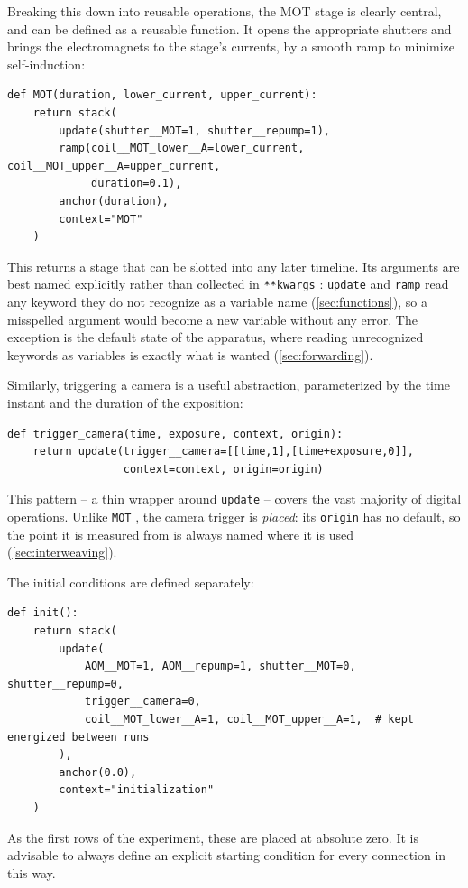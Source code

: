 \documentclass{SciPost}
\newcommand{\python}[1]{%
  \texttt{#1}%
}
\begin{document}
Breaking this down into reusable operations, the MOT stage is clearly central, and can be defined as a reusable function. It opens the appropriate shutters and brings the electromagnets to the stage’s currents, by a smooth ramp to minimize self-induction:
\begin{verbatim}
def MOT(duration, lower_current, upper_current):
    return stack(
        update(shutter__MOT=1, shutter__repump=1),
        ramp(coil__MOT_lower__A=lower_current, coil__MOT_upper__A=upper_current,
             duration=0.1),
        anchor(duration),
        context="MOT"
    )
\end{verbatim}
This returns a stage that can be slotted into any later timeline. Its arguments are best named explicitly rather than collected in \python{**kwargs}: \python{update} and \python{ramp} read any keyword they do not recognize as a variable name (\cref{sec:functions}), so a misspelled argument would become a new variable without any error. The exception is the default state of the apparatus, where reading unrecognized keywords as variables is exactly what is wanted (\cref{sec:forwarding}).

Similarly, triggering a camera is a useful abstraction, parameterized by the time instant and the duration of the exposition:
\begin{verbatim}
def trigger_camera(time, exposure, context, origin):
    return update(trigger__camera=[[time,1],[time+exposure,0]],
                  context=context, origin=origin)
\end{verbatim}
This pattern – a thin wrapper around \python{update} – covers the vast majority of digital operations. Unlike \python{MOT}, the camera trigger is \emph{placed}: its \python{origin} has no default, so the point it is measured from is always named where it is used (\cref{sec:interweaving}).

The initial conditions are defined separately:
\begin{verbatim}
def init():
    return stack(
        update(
            AOM__MOT=1, AOM__repump=1, shutter__MOT=0, shutter__repump=0,
            trigger__camera=0,
            coil__MOT_lower__A=1, coil__MOT_upper__A=1,  # kept energized between runs
        ),
        anchor(0.0),
        context="initialization"
    )
\end{verbatim}
As the first rows of the experiment, these are placed at absolute zero. It is advisable to always define an explicit starting condition for every connection in this way.
\end{document}
